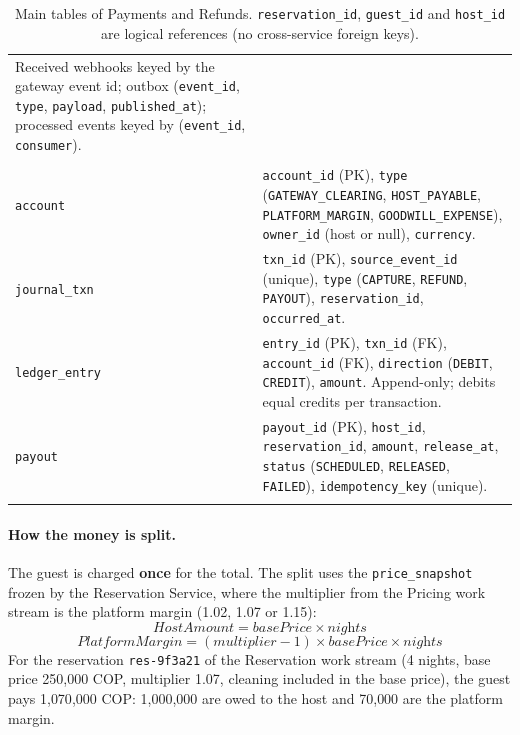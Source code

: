 \begin{longtable}{@{}L{3.6cm}L{10.2cm}@{}}
  Received webhooks keyed by the gateway event id; outbox
  (\texttt{event\_id}, \texttt{type}, \texttt{payload},
  \texttt{published\_at}); processed events keyed by (\texttt{event\_id},
  \texttt{consumer}). \\
\addlinespace
{} \\
\texttt{account} & \texttt{account\_id} (PK), \texttt{type}
  (\texttt{GATEWAY\_\allowbreak CLEARING}, \texttt{HOST\_PAYABLE},
  \texttt{PLATFORM\_\allowbreak MARGIN}, \texttt{GOODWILL\_\allowbreak EXPENSE}),
  \texttt{owner\_id} (host or null), \texttt{currency}. \\
\texttt{journal\_txn} & \texttt{txn\_id} (PK), \texttt{source\_\allowbreak event\_\allowbreak id}
  (unique), \texttt{type} (\texttt{CAPTURE}, \texttt{REFUND},
  \texttt{PAYOUT}), \texttt{reservation\_\allowbreak id}, \texttt{occurred\_at}. \\
\texttt{ledger\_entry} & \texttt{entry\_id} (PK), \texttt{txn\_id} (FK),
  \texttt{account\_id} (FK), \texttt{direction} (\texttt{DEBIT},
  \texttt{CREDIT}), \texttt{amount}. Append-only; debits equal credits per
  transaction. \\
\texttt{payout} & \texttt{payout\_id} (PK), \texttt{host\_id},
  \texttt{reservation\_\allowbreak id}, \texttt{amount}, \texttt{release\_at},
  \texttt{status} (\texttt{SCHEDULED}, \texttt{RELEASED}, \texttt{FAILED}),
  \texttt{idempotency\_\allowbreak key} (unique). \\
\bottomrule
\caption{Main tables of Payments and Refunds. \texttt{reservation\_\allowbreak id},
\texttt{guest\_id} and \texttt{host\_id} are logical references (no
cross-service foreign keys).}
\label{tab:pay-model}
\end{longtable}

\paragraph{How the money is split.} The guest is charged \textbf{once} for the
total. The split uses the \texttt{price\_\allowbreak snapshot} frozen by the
Reservation Service, where the multiplier from the Pricing work stream is the
platform margin (1.02, 1.07 or 1.15):
\[
  \textit{HostAmount} = \textit{basePrice} \times \textit{nights}
\]
\[
  \textit{PlatformMargin} = (\textit{multiplier} - 1) \times \textit{basePrice} \times \textit{nights}
\]
For the reservation \texttt{res-9f3a21} of the Reservation work stream
(4 nights, base price 250{,}000 COP, multiplier 1.07, cleaning included in the
base price), the guest pays 1{,}070{,}000 COP: 1{,}000{,}000 are owed to the
host and 70{,}000 are the platform margin.

